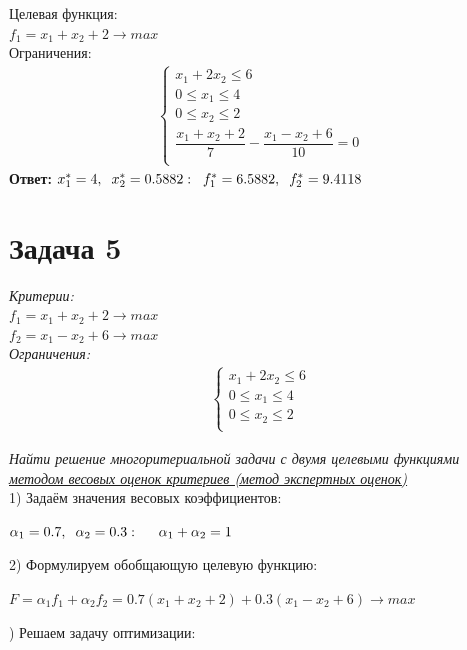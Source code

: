 \documentclass[14pt,fleqn]{extarticle}
\begin{document}
	Целевая функция:\\
	$f_1 = x_1 + x_2 + 2 \longrightarrow max$\\
	
	Ограничения:
	\begin{align*}
		\begin{cases}
			x_1 + 2x_2 \leq 6\\
			0 \leq x_1 \leq 4\\
			0 \leq x_2 \leq 2\\
			\dfrac{x_1 + x_2 + 2}{7} - \dfrac{x_1 - x_2 + 6}{10} = 0\\
		\end{cases}
	\end{align*}
	\textbf{Ответ:} $x_1^* = 4, \hspace{0.2cm} x_2^* = 0.5882: \hspace{0.2cm} f_1^* = 6.5882, \hspace{0.2cm} f_2^* = 9.4118$
	
	\section*{Задача 5}
	\textit{Критерии:}\\
	$f_1 = x_1 + x_2 + 2 \longrightarrow max$\\
	$f_2 = x_1 - x_2 + 6 \longrightarrow max$\\
	
	\textit{Ограничения:}
	\begin{align*}
		\begin{cases}
			x_1 + 2x_2 \leq 6\\
			0 \leq x_1 \leq 4\\
			0 \leq x_2 \leq 2\\
		\end{cases}
	\end{align*}

	\textit{Найти решение многоритериальной задачи с двумя целевыми функциями \underline{методом весовых оценок критериев (метод экспертных оценок)}}\\
	
	1) Задаём значения весовых коэффициентов:
	\begin{center}
		$\alpha_1 = 0.7, \hspace{0.2cm} \alpha_2 = 0.3: \hspace{0.5cm} \alpha_1 + \alpha_2 = 1$\\
	\end{center}
	2) Формулируем обобщающую целевую функцию:
	\begin{center}
		$F = \alpha_1 f_1 + \alpha_2 f_2 = 0.7(x_1 + x_2 + 2) + 0.3(x_1 - x_2 + 6) \longrightarrow max$\\
	\end{center}
	) Решаем задачу оптимизации:\\
	
\end{document}
